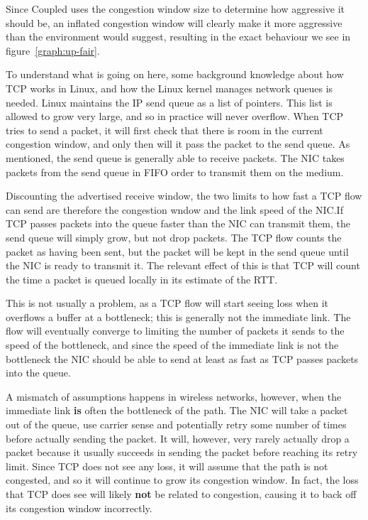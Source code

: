 Since Coupled uses the congestion window size to determine how aggressive it
should be, an inflated congestion window will clearly make it more aggressive
than the environment would suggest, resulting in the exact behaviour we see in
figure~\ref{graph:up-fair}.

To understand what is going on here, some background knowledge about how TCP
works in Linux, and how the Linux kernel manages network queues is needed. Linux
maintains the IP send queue as a list of pointers. This list is allowed to grow
very large, and so in practice will never overflow. When TCP tries to send a packet,
it will first check that there is room in the current congestion window, and only then will it pass the packet to the send queue. As mentioned, the send queue is generally able to receive packets. The NIC takes packets
from the send queue in FIFO order to transmit them on the medium.

Discounting the advertised receive window, the two limits to how fast a TCP flow can send are therefore the congestion wndow and the link speed of the NIC.\@ If
TCP passes packets into the queue faster than the NIC can transmit them, the send
queue will simply grow, but not drop packets. The TCP flow counts the packet as having been sent, but the packet will
be kept in the send queue until the NIC is ready to transmit it. The relevant effect of this is that TCP will count the time a packet is queued locally in its estimate of the RTT.

This is not usually a problem, as a TCP flow will start seeing loss when
it overflows a buffer at a bottleneck; this is generally not the immediate
link. The flow will eventually converge to limiting the number of
packets it sends to the speed of the bottleneck, and since the speed of the immediate link is not the
bottleneck the NIC should be able to send at least as fast as TCP passes packets into
the queue.

A mismatch of assumptions happens in wireless networks, however, when the
immediate link \textbf{is} often the bottleneck of the path. The NIC will take a
packet out of the queue, use carrier sense and potentially retry some number of
times before actually sending the packet. It will, however, very rarely actually
drop a packet because it usually succeeds in sending the packet before reaching
its retry limit. Since TCP does not see any loss, it will assume that the path
is not congested, and so it will continue to grow its congestion window.
In fact, the loss that TCP does see will likely \textbf{not} be related to
congestion, causing it to back off its congestion window incorrectly. %

